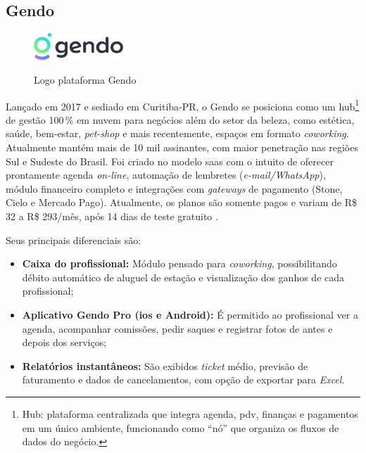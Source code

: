 \subsection{Gendo}

\begin{figure}[htb]
	\centering
	\caption{Logo plataforma Gendo}
	\includegraphics[width=0.3\textwidth]{cap01-Introducao/Images/1.4.2_Gendo}
	\label{fig:Gendo}
\end{figure}

 \FloatBarrier

Lançado em 2017 e sediado em Curitiba-PR, o Gendo se posiciona como um hub\footnote{Hub: plataforma centralizada que integra agenda, \gls{pdv}, finanças e pagamentos em um único ambiente, funcionando como “nó” que organiza os fluxos de dados do negócio.} de gestão 100\,\% em nuvem para negócios além do setor da beleza, como estética, saúde, bem-estar, \emph{pet-shop} e mais recentemente, espaços em formato \emph{coworking}. 
Atualmente mantém mais de 10 mil assinantes, com maior penetração nas regiões Sul e Sudeste do Brasil. Foi criado no modelo \gls{saas} com o intuito de oferecer prontamente agenda \emph{on-line}, automação de lembretes (\emph{e-mail/WhatsApp}), módulo financeiro completo e integrações com \emph{gateways} de pagamento (Stone, Cielo e Mercado Pago). Atualmente, os planos são somente pagos e variam de R\$ 32 a R\$ 293/mês, após 14 dias de teste gratuito \cite{Gendo}.

Seus principais diferenciais são:

\begin{itemize}
	\item \textbf{Caixa do profissional:} Módulo pensado para \emph{coworking}, possibilitando débito automático de aluguel de estação e visualização dos ganhos de cada profissional;
	
	\item \textbf{Aplicativo Gendo Pro (\gls{ios} e Android):} É permitido ao profissional ver a agenda, acompanhar comissões, pedir saques e registrar fotos de antes e depois dos serviços;
	
	\item \textbf{Relatórios instantâneos:} São exibidos \emph{ticket} médio, previsão de faturamento e dados de cancelamentos, com opção de exportar para \emph{Excel}.
\end{itemize}


